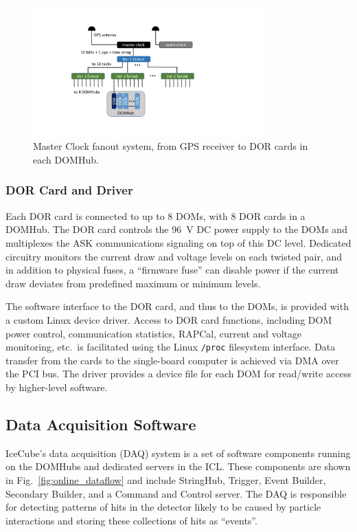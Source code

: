 \begin{figure}[!ht]
 \centering
 \includegraphics[width=0.8\textwidth]{graphics/online/data_readout/clock_fanout.pdf}
 \caption{Master Clock fanout system, from GPS receiver to DOR cards in
   each DOMHub.}
 \label{fig:clock_fanout}
\end{figure}


\subsubsection{DOR Card and Driver}

Each DOR card is connected to up to 8 DOMs, with 8 DOR cards in a
DOMHub. The DOR card controls the 96~V DC power supply to the DOMs and
multiplexes the ASK communications signaling on top of this DC level.
Dedicated circuitry monitors the current draw and voltage levels on each
twisted pair, and in addition to physical fuses, a ``firmware fuse'' can
disable power if the current draw deviates from predefined maximum or
minimum levels.

The software interface to the DOR card, and thus to the DOMs, is provided
with a custom Linux device driver.  Access to DOR card functions, including
DOM power control, communication statistics, RAPCal, current and voltage
monitoring, etc.~is facilitated using the Linux \texttt{/proc} filesystem
interface.  Data transfer from the cards to the single-board computer is
achieved via DMA over the PCI bus.  The driver provides a device file for
each DOM for read/write access by higher-level software.

\subsection{Data Acquisition Software}

IceCube's data acquisition (DAQ) system is a set of software components
running on the DOMHubs and dedicated servers in the ICL.  These components are shown in
Fig.~\ref{fig:online_dataflow} and include StringHub, Trigger, Event
Builder, Secondary Builder, and a Command and Control server.  The DAQ is
responsible for detecting patterns of hits in the detector likely to be
caused by particle interactions and storing these collections of hits as
``events''.

